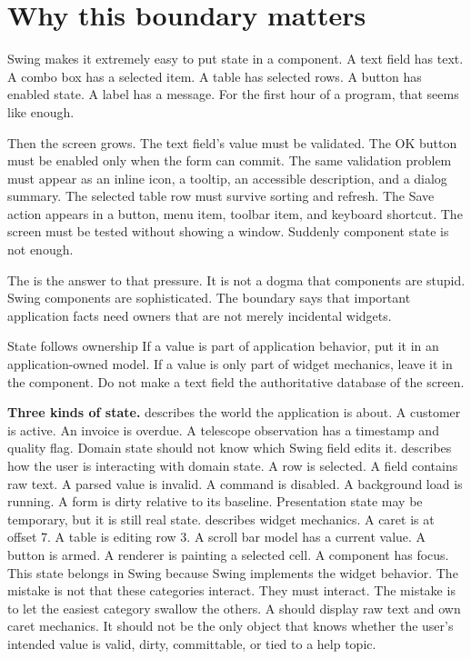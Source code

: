 \section{Why this boundary matters}

Swing makes it extremely easy to put state in a component. A text field has text. A combo box has a selected item. A table has selected rows. A button has enabled state. A label has a message. For the first hour of a program, that seems like enough.

Then the screen grows. The text field's value must be validated. The OK button must be enabled only when the form can commit. The same validation problem must appear as an inline icon, a tooltip, an accessible description, and a dialog summary. The selected table row must survive sorting and refresh. The Save action appears in a button, menu item, toolbar item, and keyboard shortcut. The screen must be tested without showing a window. Suddenly component state is not enough.

The  is the answer to that pressure. It is not a dogma that components are stupid. Swing components are sophisticated. The boundary says that important application facts need owners that are not merely incidental widgets.

\begin{principlebox}{State follows ownership}
If a value is part of application behavior, put it in an application-owned model. If a value is only part of widget mechanics, leave it in the component. Do not make a text field the authoritative database of the screen.
\end{principlebox}

\textbf{Three kinds of state.}  describes the world the application is about. A customer is active. An invoice is overdue. A telescope observation has a timestamp and quality flag. Domain state should not know which Swing field edits it.  describes how the user is interacting with domain state. A row is selected. A field contains raw text. A parsed value is invalid. A command is disabled. A background load is running. A form is dirty relative to its baseline. Presentation state may be temporary, but it is still real state.  describes widget mechanics. A caret is at offset 7. A table is editing row 3. A scroll bar model has a current value. A button is armed. A renderer is painting a selected cell. A component has focus. This state belongs in Swing because Swing implements the widget behavior. The mistake is not that these categories interact. They must interact. The mistake is to let the easiest category swallow the others. A  should display raw text and own caret mechanics. It should not be the only object that knows whether the user's intended value is valid, dirty, committable, or tied to a help topic.

